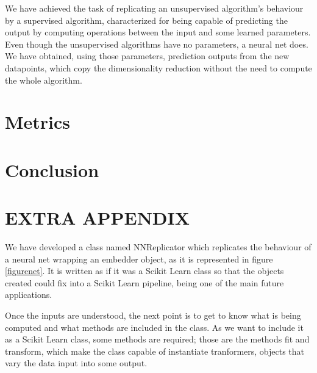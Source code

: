 \documentclass[a4paper,11pt,spanish]{report}
\begin{document}
We have achieved the task of replicating an unsupervised algorithm's behaviour by a supervised algorithm, characterized for being capable of predicting the output by computing operations between the input and some learned parameters.
Even though the unsupervised algorithms have no parameters, a neural net does. We have obtained, using those parameters, prediction outputs from the new datapoints, which copy the dimensionality reduction without the need to compute the whole algorithm.


\chapter{Metrics}
\label{chap:met}



\chapter{Conclusion}
\label{chap:conc}



\chapter{EXTRA APPENDIX}
\label{chap:append}

We have developed a class named NNReplicator which replicates the behaviour of a neural net wrapping an embedder object, as it is represented in figure \ref{figurenet}. It is written as if it was a Scikit Learn class so that the objects created could fix into a Scikit Learn pipeline, being one of the main future applications.

Once the inputs are understood, the next point is to get to know what is being computed and what methods are included in the class. As we want to include it as a Scikit Learn class, some methods are required; those are the methods fit and transform, which make the class capable of instantiate tranformers, objects that vary the data input into some output.
\end{document}
